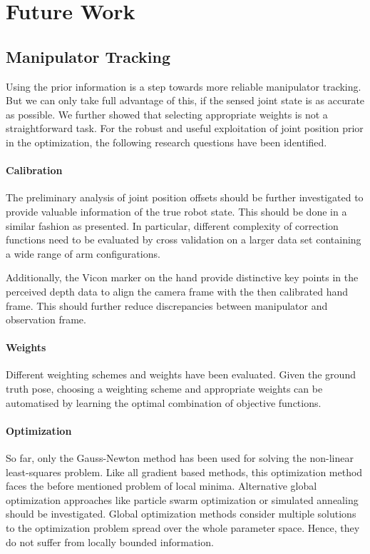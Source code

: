 \section{Future Work}

\subsection{Manipulator Tracking}

Using the prior information is a step towards more reliable manipulator tracking. But we can only take full advantage of this, if the sensed joint state is as accurate as possible. We further showed that selecting appropriate weights is not a straightforward task.
For the robust and useful exploitation of joint position prior in the optimization, the following research questions have been identified.

\vspace{-0.04cm}

\paragraph{Calibration}
The preliminary analysis of joint position offsets should be further investigated to provide valuable information of the true robot state. This should be done in a similar fashion as presented. In particular, different complexity of correction functions need to be evaluated by cross validation on a larger data set containing a wide range of arm configurations.

Additionally, the Vicon marker on the hand provide distinctive key points in the perceived depth data to align the camera frame with the then calibrated hand frame. This should further reduce discrepancies between manipulator and observation frame.

\vspace{-0.04cm}

\paragraph{Weights}
Different weighting schemes and weights have been evaluated. Given the ground truth pose, choosing a weighting scheme and appropriate weights can be automatised by learning the optimal combination of objective functions.

\vspace{-0.04cm}

\paragraph{Optimization}
So far, only the Gauss-Newton method has been used for solving the non-linear least-squares problem. Like all gradient based methods, this optimization method faces the before mentioned problem of local minima. Alternative global optimization approaches like particle swarm optimization or simulated annealing should be investigated. Global optimization methods consider multiple solutions to the optimization problem spread over the whole parameter space. Hence, they do not suffer from locally bounded information.


